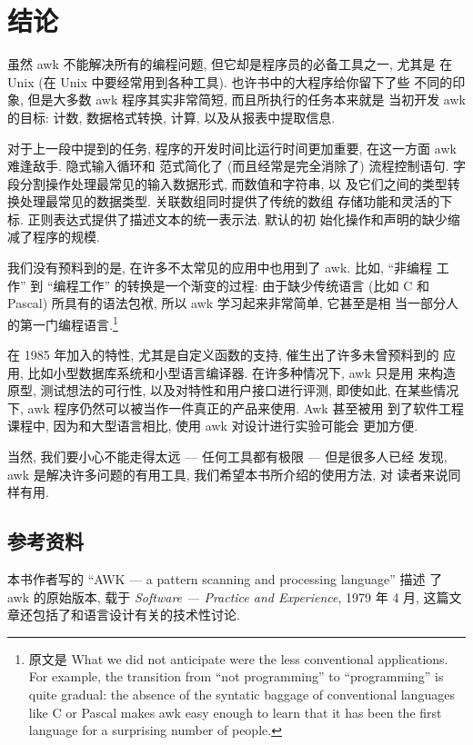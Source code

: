 \section{结论}
\label{sec:conclusion}
虽然 awk 不能解决所有的编程问题, 但它却是程序员的必备工具之一, 尤其是
在 Unix (在 Unix 中要经常用到各种工具). 也许书中的大程序给你留下了些
不同的印象, 但是大多数 awk 程序其实非常简短, 而且所执行的任务本来就是
当初开发 awk 的目标: 计数, 数据格式转换, 计算, 以及从报表中提取信息.

对于上一段中提到的任务, 程序的开发时间比运行时间更加重要, 在这一方面
awk 难逢敌手. 隐式输入循环和 \patact 范式简化了 (而且经常是完全消除了)
流程控制语句. 字段分割操作处理最常见的输入数据形式, 而数值和字符串, 以
及它们之间的类型转换处理最常见的数据类型. 关联数组同时提供了传统的数组
存储功能和灵活的下标. 正则表达式提供了描述文本的统一表示法. 默认的初
始化操作和声明的缺少缩减了程序的规模.

我们没有预料到的是,  在许多不太常见的应用中也用到了 awk. 比如, ``非编程
工作'' 到 ``编程工作'' 的转换是一个渐变的过程: 由于缺少传统语言 (比如 
C 和 Pascal) 所具有的语法包袱, 所以 awk 学习起来非常简单, 它甚至是相
当一部分人的第一门编程语言.\footnote{原文是 What we did not anticipate were
    the less conventional applications. For example, the transition from
    ``not programming'' to ``programming'' is quite gradual: the absence of
    the syntatic baggage of conventional languages like C or Pascal makes
    awk easy enough to learn that it has been the first language for a
surprising number of people.}

在 1985 年加入的特性, 尤其是自定义函数的支持, 催生出了许多未曾预料到的
应用, 比如小型数据库系统和小型语言编译器. 在许多种情况下, awk 只是用
来构造原型, 测试想法的可行性, 以及对特性和用户接口进行评测, 即使如此,
在某些情况下, awk 程序仍然可以被当作一件真正的产品来使用. Awk 甚至被用
到了软件工程课程中, 因为和大型语言相比, 使用 awk 对设计进行实验可能会
更加方便.

当然, 我们要小心不能走得太远 --- 任何工具都有极限 --- 但是很多人已经
发现, awk 是解决许多问题的有用工具, 我们希望本书所介绍的使用方法, 对
读者来说同样有用.

\subsection*{参考资料}

本书作者写的 ``AWK --- a pattern scanning and processing language'' 描述
了 awk 的原始版本, 载于 \textit{Software --- Practice and Experience},
1979 年 4 月, 这篇文章还包括了和语言设计有关的技术性讨论.

